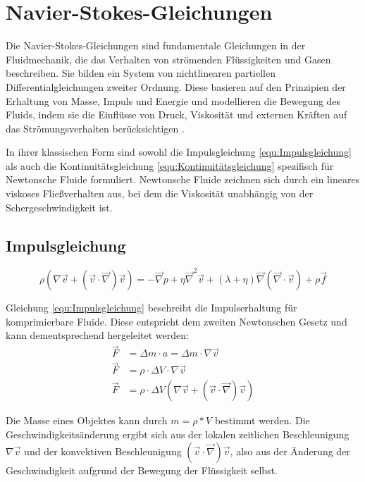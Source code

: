 \documentclass[a4paper, 12pt]{article}
\begin{document}
\section{Navier-Stokes-Gleichungen} \label{Kap:NavierStrokes}
Die Navier-Stokes-Gleichungen sind fundamentale Gleichungen in der Fluidmechanik, die das Verhalten von strömenden Flüssigkeiten und Gasen beschreiben. Sie bilden ein System von nichtlinearen partiellen Differentialgleichungen zweiter Ordnung. Diese basieren auf den Prinzipien der Erhaltung von Masse, Impuls und Energie und modellieren die Bewegung des Fluids, indem sie die Einflüsse von Druck, Viskosität und externen Kräften auf das Strömungsverhalten berücksichtigen \cite{studyflix_navierstokes}.

In ihrer klassischen Form sind sowohl die Impulsgleichung \eqref{equ:Impulsgleichung} als auch die Kontinuitätsgleichung \eqref{equ:Kontinuitätsgleichung} spezifisch für Newtonsche Fluide formuliert. Newtonsche Fluide zeichnen sich durch ein lineares viskoses Fließverhalten aus, bei dem die Viskosität unabhängig von der Schergeschwindigkeit ist.


\subsection{Impulsgleichung}
\begin{equation} \label{equ:Impulsgleichung}
	\rho(\nabla \vec{v} + (\vec{v} \cdot \vec{\nabla})\vec{v}) = - \vec{\nabla}p + \eta \vec{\nabla}^2 \vec{v} + (\lambda + \eta)\vec{\nabla}(\vec{\nabla} \cdot \vec{v}) + \rho \vec{f}
\end{equation}

Gleichung \eqref{equ:Impulsgleichung} beschreibt die Impulserhaltung für komprimierbare Fluide. Diese entspricht dem zweiten Newtonschen Gesetz und kann dementsprechend hergeleitet werden:
\begin{align}
	\vec{F} & =\Delta m \cdot a = \Delta m \cdot \nabla \vec{v} \nonumber                 \\
	\vec{F} & =\rho \cdot \Delta V \cdot \nabla \vec{v} \nonumber                         \\
	\vec{F} & =\rho \cdot \Delta V (\nabla \vec{v} + (\vec{v} \cdot \vec{\nabla})\vec{v})
	\label{equ:Newtonsches_Gesetz}
\end{align}

Die Masse eines Objektes kann durch $m = \rho * V$ bestimmt werden. Die Geschwindigkeitsänderung ergibt sich aus der lokalen zeitlichen Beschleunigung $\nabla \vec{v}$ und der konvektiven Beschleunigung $(\vec{v} \cdot \vec{\nabla})\vec{v}$, also aus der Änderung der Geschwindigkeit aufgrund der Bewegung der Flüssigkeit selbst.
\end{document}
